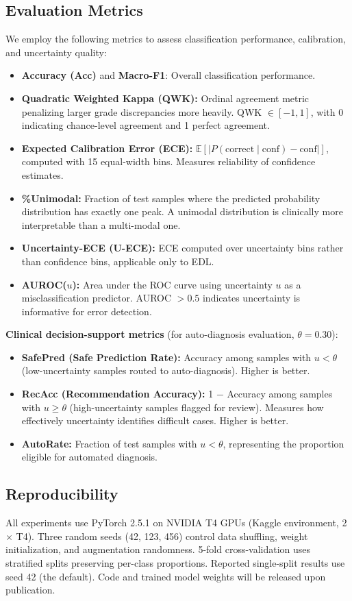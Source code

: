 \subsection{Evaluation Metrics}

We employ the following metrics to assess classification performance, calibration, and uncertainty quality:

\begin{itemize}
    \item \textbf{Accuracy (Acc)} and \textbf{Macro-F1}: Overall classification performance.
    \item \textbf{Quadratic Weighted Kappa (QWK):} Ordinal agreement metric penalizing larger grade discrepancies more heavily. QWK $\in [-1, 1]$, with 0 indicating chance-level agreement and 1 perfect agreement.
    \item \textbf{Expected Calibration Error (ECE):} $\mathbb{E}[|P(\text{correct} \mid \text{conf}) - \text{conf}|]$, computed with 15 equal-width bins. Measures reliability of confidence estimates.
    \item \textbf{\%Unimodal:} Fraction of test samples where the predicted probability distribution has exactly one peak. A unimodal distribution is clinically more interpretable than a multi-modal one.
    \item \textbf{Uncertainty-ECE (U-ECE):} ECE computed over uncertainty bins rather than confidence bins, applicable only to EDL.
    \item \textbf{AUROC($u$):} Area under the ROC curve using uncertainty $u$ as a misclassification predictor. AUROC $>0.5$ indicates uncertainty is informative for error detection.
\end{itemize}

\textbf{Clinical decision-support metrics} (for auto-diagnosis evaluation, $\theta = 0.30$):

\begin{itemize}
    \item \textbf{SafePred (Safe Prediction Rate):} Accuracy among samples with $u < \theta$ (low-uncertainty samples routed to auto-diagnosis). Higher is better.
    \item \textbf{RecAcc (Recommendation Accuracy):} 1 $-$ Accuracy among samples with $u \geq \theta$ (high-uncertainty samples flagged for review). Measures how effectively uncertainty identifies difficult cases. Higher is better.
    \item \textbf{AutoRate:} Fraction of test samples with $u < \theta$, representing the proportion eligible for automated diagnosis.
\end{itemize}

\subsection{Reproducibility}

All experiments use PyTorch 2.5.1 on NVIDIA T4 GPUs (Kaggle environment, 2$\times$ T4). Three random seeds (42, 123, 456) control data shuffling, weight initialization, and augmentation randomness. 5-fold cross-validation uses stratified splits preserving per-class proportions. Reported single-split results use seed 42 (the default). Code and trained model weights will be released upon publication.
